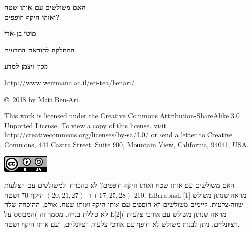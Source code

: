 \documentclass[12pt,a4paper]{article}
\begin{document}
\thispagestyle{empty}


\begin{center}
\textbf{\Huge%
האם משולשים עם אותו שטח\\
\bigskip
ואותו היקף חופפים?%
}

\bigskip

\bigskip

\textbf{\Large מוטי בן-ארי}

\bigskip

\textbf{\Large המחלקה להוראת המדעים}

\bigskip

\textbf{\Large מכון ויצמן למדע}

\bigskip

\url{http://www.weizmann.ac.il/sci-tea/benari/}
\end{center}

\bigskip
\bigskip

\begin{center}
\copyright{}\  2018 by Moti Ben-Ari.

\end{center}


{\small This work is licensed under the Creative Commons Attribution-ShareAlike 3.0 Unported License. To view a copy of this license, visit \url{http://creativecommons.org/licenses/by-sa/3.0/} or send a letter to Creative Commons, 444 Castro Street, Suite 900, Mountain View, California, 94041, USA.}

\bigskip

\begin{center}
\includegraphics[width=.2\textwidth]{../by-sa.png}
\end{center}


\newpage


האם משולשים עם אותו שטח ואותו היקף חופפים? לא בהכרח: למשולשים עם הצלעות
$(17,25,28)$
ו-%
$(20,21,27)$
היקף
$70$
ושטח 
$210$.
\L{Barabash [1]}
מראה שנתון משולש שווה-צלעות, קיימים משולשים לא חופפים עם אותו היקף ואותו שטח. אולם, ההוכחה שלה לא כוללת בנייה. מסמך זה )המבוסס על 
\L{[2]}(
מראה שנתון משולש עם אורכי צלעות רציונליים, ניתן לבנות משולש לא-חופף עם אורכי צלעות רציונליים, ועם אותו היקף ושטח.
\end{document}
